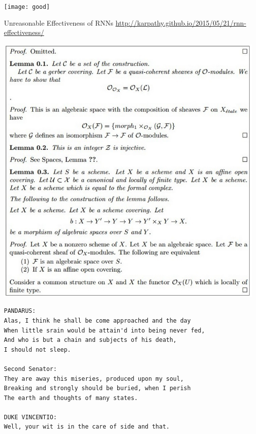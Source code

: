 \documentclass{beamer}
\begin{document}
\begin{frame}{}
  \begin{center}
    \texttt{[image: good]}
  \end{center}
\end{frame}

\begin{frame}{Unreasonable Effectiveness of RNNs}
  \url{http://karpathy.github.io/2015/05/21/rnn-effectiveness/}
\end{frame}

\begin{frame}
  \begin{center}
    \includegraphics[width=0.8\linewidth]{../latex3}
  \end{center}
\end{frame}

\begin{frame}[fragile]
\begin{verbatim}
PANDARUS:
Alas, I think he shall be come approached and the day
When little srain would be attain'd into being never fed,
And who is but a chain and subjects of his death,
I should not sleep.

Second Senator:
They are away this miseries, produced upon my soul,
Breaking and strongly should be buried, when I perish
The earth and thoughts of many states.

DUKE VINCENTIO:
Well, your wit is in the care of side and that.
\end{verbatim}
\end{frame}
\end{document}
